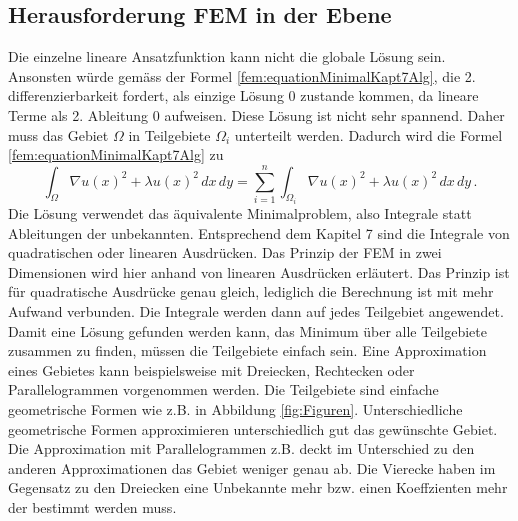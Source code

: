 \subsection{Herausforderung FEM in der Ebene}
Die einzelne lineare Ansatzfunktion kann nicht die globale Lösung sein. Ansonsten würde gemäss der Formel \eqref{fem:equationMinimalKapt7Alg}, die 2. differenzierbarkeit fordert, als einzige Lösung 0 zustande kommen, da lineare Terme als 2. Ableitung 0 aufweisen. Diese Lösung ist nicht sehr spannend. Daher muss das Gebiet $\Omega$ in Teilgebiete $\Omega_i$ unterteilt werden. Dadurch wird die Formel \eqref{fem:equationMinimalKapt7Alg} zu
\begin{equation}
\int_{\Omega} \nabla u(x)^2 + \lambda u(x)^2 \, dx \, dy = \sum \limits_{i=1}^n \int_{\Omega_i} \nabla u(x)^2 + \lambda u(x)^2 \, dx \, dy \, .
\label{fem:equationSummGebiete}
\end{equation}
Die Lösung verwendet das äquivalente Minimalproblem, also Integrale statt Ableitungen der unbekannten. Entsprechend dem Kapitel 7 sind die Integrale von quadratischen oder linearen Ausdrücken. Das Prinzip der FEM in zwei Dimensionen wird hier anhand von linearen Ausdrücken erläutert. Das Prinzip ist für quadratische Ausdrücke genau gleich, lediglich die Berechnung ist mit mehr Aufwand verbunden. Die Integrale werden dann auf jedes Teilgebiet angewendet. \\
Damit eine Lösung gefunden werden kann, das Minimum über alle Teilgebiete zusammen zu finden, müssen die Teilgebiete einfach sein. Eine Approximation eines Gebietes kann beispielsweise mit Dreiecken, Rechtecken oder Parallelogrammen vorgenommen werden. Die Teilgebiete sind einfache geometrische Formen wie z.B. in Abbildung \ref{fig:Figuren}. Unterschiedliche geometrische Formen approximieren unterschiedlich gut das gewünschte Gebiet. Die Approximation mit Parallelogrammen z.B. deckt im Unterschied zu den anderen Approximationen das Gebiet weniger genau ab. Die Vierecke haben im Gegensatz zu den Dreiecken eine Unbekannte mehr bzw. einen Koeffzienten mehr der bestimmt werden  muss.
